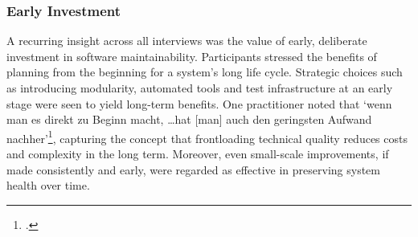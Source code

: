 \subsubsection{Early Investment}
A recurring insight across all interviews was the value of early, deliberate investment in software maintainability. Participants stressed the benefits of planning from the beginning for a system's long life cycle. Strategic choices such as introducing modularity, automated tools and test infrastructure at an early stage were seen to yield long-term benefits.
One practitioner noted that `wenn man es direkt zu Beginn macht, \ldots hat [man] auch den geringsten Aufwand nachher'\footcite{Interview32025}, capturing the concept that frontloading technical quality reduces costs and complexity in the long term. Moreover, even small-scale improvements, if made consistently and early, were regarded as effective in preserving system health over time.

